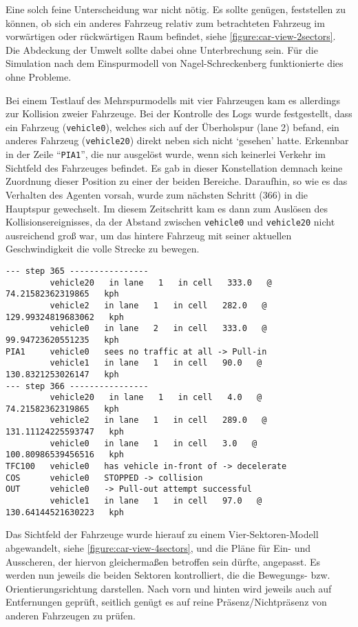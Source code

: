 Eine solch feine Unterscheidung war nicht nötig.
Es sollte genügen, feststellen zu können, ob sich ein anderes Fahrzeug relativ zum betrachteten Fahrzeug im vorwärtigen oder rückwärtigen Raum befindet, siehe \cref{figure:car-view-2sectors}. 
Die Abdeckung der Umwelt sollte dabei ohne Unterbrechung sein.
Für die Simulation nach dem Einspurmodell von Nagel-Schreckenberg funktionierte dies ohne Probleme.

Bei einem Testlauf des Mehrspurmodells mit vier Fahrzeugen kam es allerdings zur Kollision zweier Fahrzeuge. 
Bei der Kontrolle des Logs wurde festgestellt, dass ein Fahrzeug (\texttt{vehicle0}), welches sich auf der Überholspur (lane 2) befand, ein anderes Fahrzeug (\texttt{vehicle20}) direkt neben sich nicht \enquote*{gesehen} hatte. 
Erkennbar in der Zeile \enquote{\texttt{PIA1}}, die nur ausgelöst wurde, wenn sich keinerlei Verkehr im Sichtfeld des Fahrzeuges befindet.
Es gab in dieser Konstellation demnach keine Zuordnung dieser Position zu einer der beiden Bereiche.
Daraufhin, so wie es das Verhalten des Agenten vorsah, wurde zum nächsten Schritt (366) in die Hauptspur gewechselt. 
Im diesem Zeitschritt kam es dann zum Auslösen des Kollisionsereignisses, da der Abstand zwischen \texttt{vehicle0} und \texttt{vehicle20} nicht ausreichend groß war, um das hintere Fahrzeug mit seiner aktuellen Geschwindigkeit die volle Strecke zu bewegen.

\footnotesize\begin{verbatim}
--- step 365 ----------------
         vehicle20   in lane   1   in cell   333.0   @   74.21582362319865   kph
         vehicle2   in lane   1   in cell   282.0   @   129.99324819683062   kph
         vehicle0   in lane   2   in cell   333.0   @   99.94723620551235   kph
PIA1     vehicle0   sees no traffic at all -> Pull-in
         vehicle1   in lane   1   in cell   90.0   @   130.8321253026147   kph
--- step 366 ----------------
         vehicle20   in lane   1   in cell   4.0   @   74.21582362319865   kph
         vehicle2   in lane   1   in cell   289.0   @   131.11124225593747   kph
         vehicle0   in lane   1   in cell   3.0   @   100.80986539456516   kph
TFC100   vehicle0   has vehicle in-front of -> decelerate
COS      vehicle0   STOPPED -> collision
OUT      vehicle0   -> Pull-out attempt successful
         vehicle1   in lane   1   in cell   97.0   @   130.64144521630223   kph
\end{verbatim}
\normalsize

Das Sichtfeld der Fahrzeuge wurde hierauf zu einem Vier-Sektoren-Modell abgewandelt, siehe \cref{figure:car-view-4sectors}, und die Pläne für Ein- und Ausscheren, der hiervon gleichermaßen betroffen sein dürfte, angepasst.
Es werden nun jeweils die beiden Sektoren kontrolliert, die die Bewegungs- bzw. Orientierungsrichtung darstellen. 
Nach vorn und hinten wird jeweils auch auf Entfernungen geprüft, seitlich genügt es auf reine Präsenz/Nichtpräsenz von anderen Fahrzeugen zu prüfen.

